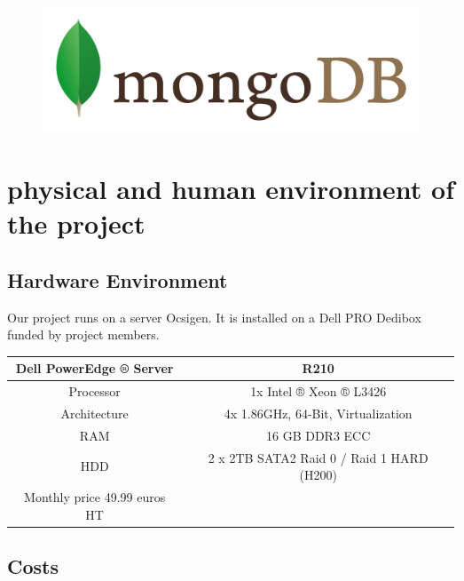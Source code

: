 \documentclass {life-en}
\begin{document}
\begin{figure}[H]
  \begin{center}
    \includegraphics[width=13cm]{img/mongodb.png}
  \end{center}
\end{figure}


\chapter{physical and human environment of the project}

\section{Hardware Environment}

Our project runs on a server Ocsigen. It is installed on a Dell PRO Dedibox funded by project members.

\vspace{20pt}

\begin{tabular}{| c | c |}
  \hline
   Dell PowerEdge ® Server & R210 \\
  \hline
  Processor & 1x Intel ® Xeon ® L3426 \\
  \hline
  Architecture & 4x 1.86GHz, 64-Bit, Virtualization \\
  \hline
  RAM & 16 GB DDR3 ECC \\
  \hline
  HDD & 2 x 2TB SATA2 Raid 0 / Raid 1 HARD (H200) \\
  \hline
  Monthly price 49.99 euros HT & \\
  \hline
\end{tabular}

\vspace{20pt}

\section{Costs}
\end{document}
